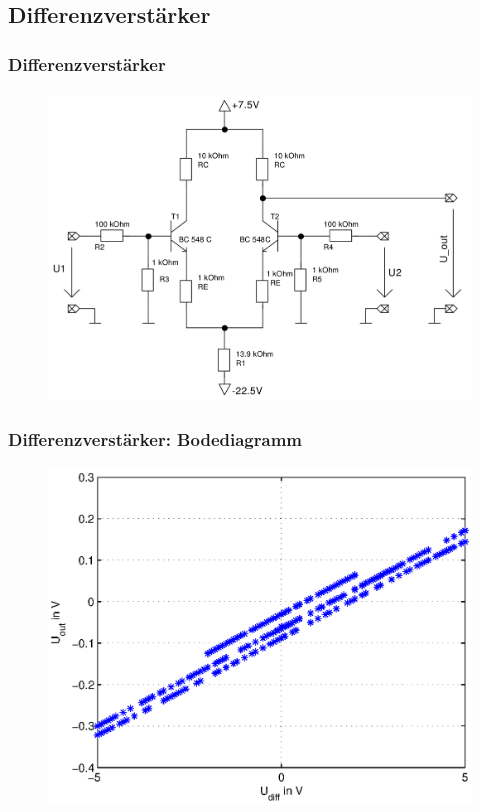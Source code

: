 \subsection{Differenzverstärker} %
\label{sub:Differenzverstärker}
\begin{frame}
    \frametitle{Differenzverstärker}
    \framesubtitle{}
    \begin{figure}[H]
    \begin{center}
            \includegraphics[scale=0.2]{./img/schaltungen/differenz_einfach.png}
    \end{center}
    \end{figure}
\end{frame}
\begin{frame}
    \frametitle{Differenzverstärker: Bodediagramm}
    \framesubtitle{}
     \begin{figure}[H]
     \begin{center}
             \includegraphics[scale=0.5]{./img/bode/Aufgabe_3_3_Ud.eps}
     \end{center}
     \end{figure}
\end{frame}
